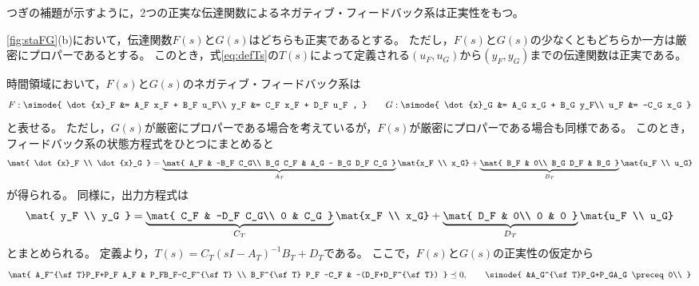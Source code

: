 \documentclass[tombow,dvipdfmx]{corona-a5}
\begin{document}
つぎの補題が示すように，2つの正実な伝達関数によるネガティブ・フィードバック系は正実性をもつ。


\begin{補題}[正実な伝達関数のフィードバック系]\label{lem:prpre}
\ref{fig:staFG}(b)において，伝達関数$F(s)$と$G(s)$はどちらも正実であるとする。
ただし，$F(s)$と$G(s)$の少なくともどちらか一方は厳密にプロパーであるとする。
このとき，式\ref{eq:defTs}の$T(s)$によって定義される$(u_F,u_G)$から$(y_F,y_G)$までの伝達関数は正実である。
\end{補題}

\begin{証明}
時間領域において，$F(s)$と$G(s)$のネガティブ・フィードバック系は
\begin{align*}
F: \simode{
\dot{x}_F &= A_F x_F + B_F u_F\\
y_F &= C_F x_F + D_F u_F ,
}
\qquad
G: \simode{
\dot{x}_G &= A_G x_G + B_G y_F\\
u_F &= -C_G x_G 
}
\end{align*}
と表せる。
ただし，$G(s)$が厳密にプロパーである場合を考えているが，$F(s)$が厳密にプロパーである場合も同様である。
このとき，フィードバック系の状態方程式をひとつにまとめると
\begin{align*}
\mat{
\dot{x}_F \\ \dot{x}_G
}
 =
 \underbrace{
\mat{
A_F & -B_F C_G\\
B_G C_F & A_G - B_G D_F C_G
}
}_{A_T}
\mat{x_F \\ x_G}
+
\underbrace{
\mat{
B_F & 0\\
B_G D_F & B_G
}
}_{B_T}
\mat{u_F \\ u_G}
\end{align*}
が得られる。
同様に，出力方程式は
\begin{align*}
\mat{
y_F \\ y_G
}
 =
\underbrace{
\mat{
C_F & -D_F C_G\\
0 & C_G
}
}_{C_T}
\mat{x_F \\ x_G}
+ 
\underbrace{
\mat{
D_F & 0\\
0 & 0
}
}_{D_T}
\mat{u_F \\ u_G}
\end{align*}
とまとめられる。
定義より，$T(s) = C_T (sI -A_T)^{-1}B_T + D_T$である。
ここで，$F(s)$と$G(s)$の正実性の仮定から
\begin{align}\label{eq:asumpr}
\mat{
A_F^{\sf T}P_F+P_F A_F & P_FB_F-C_F^{\sf T} \\
B_F^{\sf T} P_F -C_F & -(D_F+D_F^{\sf T})
}\preceq 0
,\qquad
\simode{
&A_G^{\sf T}P_G+P_GA_G \preceq 0\\
}
\end{align}
\end{証明}
\end{document}
